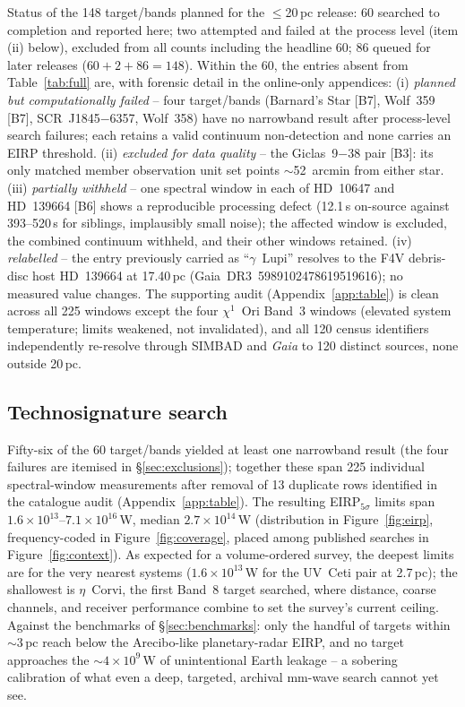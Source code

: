 \documentclass{openjournal}
\begin{document}
Status of the 148 target/bands planned for the $\le$20\,pc release: 60 searched to completion and
reported here; two attempted and failed at the process level (item (ii)
below), excluded from all counts including the headline 60; 86 queued
for later releases ($60+2+86=148$). Within the 60, the entries absent
from Table~\ref{tab:full} are, with forensic detail in the online-only
appendices:
(i) \emph{planned but computationally failed} -- four target/bands
(Barnard's Star [B7], Wolf~359 [B7], SCR~J1845$-$6357, Wolf~358) have
no narrowband result after process-level search failures; each retains
a valid continuum non-detection and none carries an EIRP threshold.
(ii) \emph{excluded for data quality} -- the Giclas~9$-$38 pair [B3]:
its only matched member observation unit set points $\sim$52~arcmin
from either star.
(iii) \emph{partially withheld} -- one spectral window in each of
HD~10647 and HD~139664 [B6] shows a reproducible processing defect
(12.1\,s on-source against 393--520\,s for siblings, implausibly small
noise); the affected window is excluded, the combined continuum
withheld, and their other windows retained.
(iv) \emph{relabelled} -- the entry previously carried as
``$\gamma$~Lupi'' resolves to the F4V debris-disc host HD~139664 at
17.40\,pc (Gaia~DR3~5989102478619519616); no measured value changes.
The supporting audit (Appendix~\ref{app:table}) is clean across all
225 windows except the four $\chi^{1}$~Ori Band~3 windows (elevated
system temperature; limits weakened, not invalidated), and all 120
census identifiers independently re-resolve through SIMBAD and
\emph{Gaia} to 120 distinct sources, none outside 20\,pc.

\subsection{Technosignature search}
\label{sec:technosearch}

Fifty-six of the 60 target/bands yielded at least one narrowband
result (the four failures are itemised in \S\ref{sec:exclusions});
together these span 225 individual spectral-window measurements after
removal of 13 duplicate rows identified in the catalogue audit
(Appendix~\ref{app:table}). The resulting EIRP$_{5\sigma}$ limits span
$1.6\times10^{13}$--$7.1\times10^{16}$\,W, median
$2.7\times10^{14}$\,W (distribution in Figure~\ref{fig:eirp},
frequency-coded in Figure~\ref{fig:coverage}, placed among published
searches in Figure~\ref{fig:context}). As expected for a
volume-ordered survey, the deepest limits are for the very nearest
systems ($1.6\times10^{13}$\,W for the UV~Ceti pair at 2.7\,pc); the
shallowest is $\eta$~Corvi, the first Band~8 target searched, where
distance, coarse channels, and receiver performance combine to set
the survey's current ceiling. Against the benchmarks of
\S\ref{sec:benchmarks}: only the handful of targets within
$\sim$3\,pc reach below the Arecibo-like planetary-radar EIRP, and no
target approaches the $\sim4\times10^{9}$\,W of unintentional Earth
leakage -- a sobering calibration of what even a deep, targeted,
archival mm-wave search cannot yet see.
\end{document}
